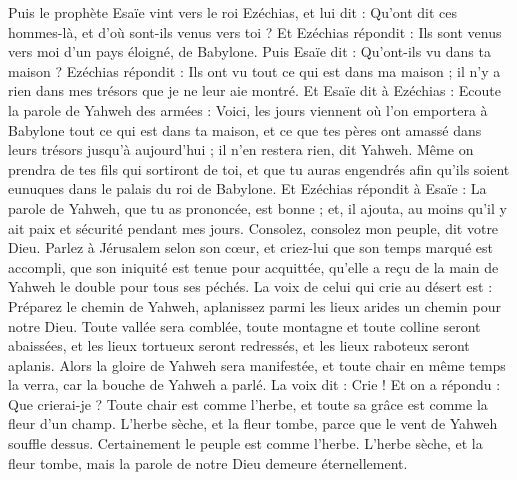 \begin{multicols}{2}
Puis le prophète Esaïe vint vers le roi Ezéchias, et lui dit : Qu'ont dit ces hommes-là, et d'où sont-ils venus vers toi ? Et Ezéchias répondit : Ils sont venus vers moi d'un pays éloigné, de Babylone.
Puis Esaïe dit : Qu'ont-ils vu dans ta maison ? Ezéchias répondit : Ils ont vu tout ce qui est dans ma maison ; il n'y a rien dans mes trésors que je ne leur aie montré.
Et Esaïe dit à Ezéchias : Ecoute la parole de Yahweh des armées :
Voici, les jours viennent où l'on emportera à Babylone tout ce qui est dans ta maison, et ce que tes pères ont amassé dans leurs trésors jusqu'à aujourd'hui ; il n'en restera rien, dit Yahweh.
Même on prendra de tes fils qui sortiront de toi, et que tu auras engendrés afin qu'ils soient eunuques dans le palais du roi de Babylone.
Et Ezéchias répondit à Esaïe : La parole de Yahweh, que tu as prononcée, est bonne ; et, il ajouta, au moins qu'il y ait paix et sécurité pendant mes jours.
\VerseOne{}Consolez, consolez mon peuple, dit votre Dieu.
Parlez à Jérusalem selon son cœur, et criez-lui que son temps marqué est accompli, que son iniquité est tenue pour acquittée, qu'elle a reçu de la main de Yahweh le double pour tous ses péchés.
La voix de celui qui crie au désert est : Préparez le chemin de Yahweh, aplanissez parmi les lieux arides un chemin pour notre Dieu.
Toute vallée sera comblée, toute montagne et toute colline seront abaissées, et les lieux tortueux seront redressés, et les lieux raboteux seront aplanis.
Alors la gloire de Yahweh sera manifestée, et toute chair en même temps la verra, car la bouche de Yahweh a parlé.
La voix dit : Crie ! Et on a répondu : Que crierai-je ? Toute chair est comme l'herbe, et toute sa grâce est comme la fleur d'un champ.
L'herbe sèche, et la fleur tombe, parce que le vent de Yahweh souffle dessus. Certainement le peuple est comme l'herbe.
L'herbe sèche, et la fleur tombe, mais la parole de notre Dieu demeure éternellement.

\end{multicols}
